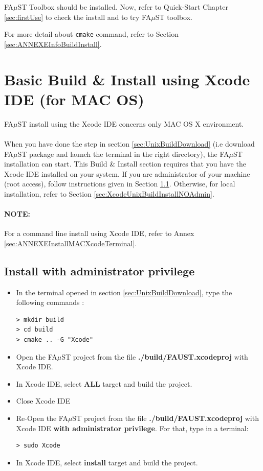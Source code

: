 FA$\mu$ST Toolbox should be installed. Now, refer to Quick-Start Chapter \ref{sec:firstUse} to check the install and to try FA$\mu$ST toolbox.

For more detail about \texttt{cmake} command, refer to Section \ref{sec:ANNEXEInfoBuildInstall}.


\section{Basic Build \& Install using Xcode IDE (for MAC OS)}\label{sec:MacInstallXcode}

FA$\mu$ST install using the Xcode IDE concerns only MAC OS X environment.
\paragraph{}When you have done the step in section  \ref{sec:UnixBuildDownload} (i.e download FA$\mu$ST package and launch the terminal in the right directory),  the FA$\mu$ST installation can start. This Build \& Install section requires that you have the Xcode IDE installed on your system. If you are administrator of your machine (root access), follow instructions given in Section \ref{sec:XcodeUnixBuildInstallAdmin}. Otherwise, for local installation, refer to Section \ref{sec:XcodeUnixBuildInstallNOAdmin}. 

\paragraph{NOTE: }For a command line install using Xcode IDE, refer to Annex \ref{sec:ANNEXEInstallMACXcodeTerminal}.  

\subsection{Install with administrator privilege}\label{sec:XcodeUnixBuildInstallAdmin}
 
\begin{itemize}
\item In the terminal opened in section 
\ref{sec:UnixBuildDownload}, type the following commands : 
\lstset{style=customBash}
\begin{lstlisting}
> mkdir build
> cd build
> cmake .. -G "Xcode"
\end{lstlisting}

\item Open the FA$\mu$ST project from the file \textbf{./build/FAUST.xcodeproj} with Xcode IDE. 
\item In Xcode IDE, select \textbf{ALL} target and build the project. 
\item Close Xcode IDE
\item Re-Open the FA$\mu$ST project from the file \textbf{./build/FAUST.xcodeproj} with Xcode IDE \textbf{with administrator privilege}. For that, type in a terminal:
\lstset{style=customBash}
\begin{lstlisting}
> sudo Xcode
\end{lstlisting}
\item In Xcode IDE, select \textbf{install} target and build the project. 
\end{itemize}

